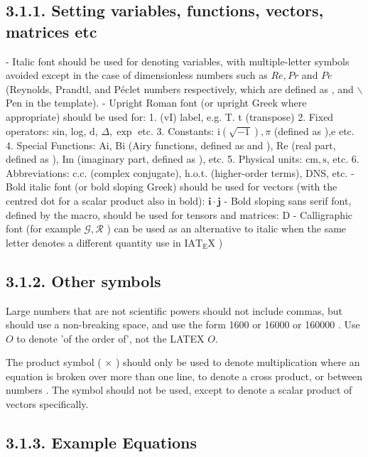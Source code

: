 \documentclass[12pt,a4paper]{article}
\begin{document}
\subsection*{3.1.1. Setting variables, functions, vectors, matrices etc}
- Italic font should be used for denoting variables, with multiple-letter symbols avoided except in the case of dimensionless numbers such as \(R e, P r\) and \(P e\) (Reynolds, Prandtl, and Péclet numbers respectively, which are defined as \Rey, \Pran and \(\backslash\) Pen in the template).
- Upright Roman font (or upright Greek where appropriate) should be used for:
1. (vI) label, e.g. T. t (transpose)
2. Fixed operators: sin, log, d, \(\Delta, \exp\) etc.
3. Constants: \(\mathrm{i}(\sqrt{-1}), \pi\) (defined as \upi),e etc.
4. Special Functions: Ai, Bi (Airy functions, defined as \Ai and \Bi), Re (real part, defined as \Real), Im (imaginary part, defined as \Imag), etc.
5. Physical units: \(\mathrm{cm}, \mathrm{s}\), etc.
6. Abbreviations: c.c. (complex conjugate), h.o.t. (higher-order terms), DNS, etc.
- Bold italic font (or bold sloping Greek) should be used for vectors (with the centred dot for a scalar product also in bold): \(\boldsymbol{i} \cdot \boldsymbol{j}\)
- Bold sloping sans serif font, defined by the \mathsfbi macro, should be used for tensors and matrices: D
- Calligraphic font (for example \(\mathcal{G}, \mathcal{R}\) ) can be used as an alternative to italic when the same letter denotes a different quantity use \mathcal in \(\mathrm{IAT}_{\mathrm{E}} \mathrm{X}\) )

\subsection*{3.1.2. Other symbols}

Large numbers that are not scientific powers should not include commas, but should use a non-breaking space, and use the form 1600 or 16000 or 160000 . Use \(O\) to denote 'of the order of', not the LATEX \(O\).

The product symbol ( × ) should only be used to denote multiplication where an equation is broken over more than one line, to denote a cross product, or between numbers . The symbol should not be used, except to denote a scalar product of vectors specifically.

\subsection*{3.1.3. Example Equations}
\end{document}
